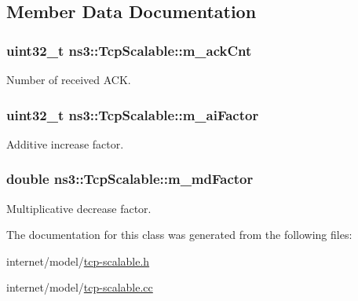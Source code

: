 \subsection{Member Data Documentation}
\subsubsection[{\texorpdfstring{m\+\_\+ack\+Cnt}{m_ackCnt}}]{\setlength{\rightskip}{0pt plus 5cm}uint32\+\_\+t ns3\+::\+Tcp\+Scalable\+::m\+\_\+ack\+Cnt\hspace{0.3cm}{\ttfamily [private]}}\hypertarget{classns3_1_1TcpScalable_a61ab84bfbbec1ed78ca9c7b60d9aaa5a}{}\label{classns3_1_1TcpScalable_a61ab84bfbbec1ed78ca9c7b60d9aaa5a}


Number of received A\+CK. 

\subsubsection[{\texorpdfstring{m\+\_\+ai\+Factor}{m_aiFactor}}]{\setlength{\rightskip}{0pt plus 5cm}uint32\+\_\+t ns3\+::\+Tcp\+Scalable\+::m\+\_\+ai\+Factor\hspace{0.3cm}{\ttfamily [private]}}\hypertarget{classns3_1_1TcpScalable_a850f65ce80a8d0293fe0a3d84b74e69c}{}\label{classns3_1_1TcpScalable_a850f65ce80a8d0293fe0a3d84b74e69c}


Additive increase factor. 

\subsubsection[{\texorpdfstring{m\+\_\+md\+Factor}{m_mdFactor}}]{\setlength{\rightskip}{0pt plus 5cm}double ns3\+::\+Tcp\+Scalable\+::m\+\_\+md\+Factor\hspace{0.3cm}{\ttfamily [private]}}\hypertarget{classns3_1_1TcpScalable_a96c1fea146c632394e7d3150c92ad7b6}{}\label{classns3_1_1TcpScalable_a96c1fea146c632394e7d3150c92ad7b6}


Multiplicative decrease factor. 



The documentation for this class was generated from the following files\+:\begin{DoxyCompactItemize}
\item 
internet/model/\hyperlink{tcp-scalable_8h}{tcp-\/scalable.\+h}\item 
internet/model/\hyperlink{tcp-scalable_8cc}{tcp-\/scalable.\+cc}\end{DoxyCompactItemize}
